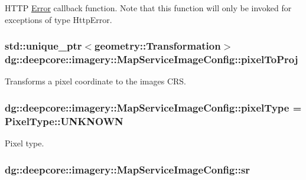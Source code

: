 H\+T\+TP \hyperlink{classdg_1_1deepcore_1_1_error}{Error} callback function. Note that this function will only be invoked for exceptions of type Http\+Error. 

\subsubsection[{\texorpdfstring{pixel\+To\+Proj}{pixelToProj}}]{\setlength{\rightskip}{0pt plus 5cm}std\+::unique\+\_\+ptr$<${\bf geometry\+::\+Transformation}$>$ dg\+::deepcore\+::imagery\+::\+Map\+Service\+Image\+Config\+::pixel\+To\+Proj}\hypertarget{structdg_1_1deepcore_1_1imagery_1_1_map_service_image_config_aae8a095c9f950f114e113e86b82ecf66}{}\label{structdg_1_1deepcore_1_1imagery_1_1_map_service_image_config_aae8a095c9f950f114e113e86b82ecf66}


Transforms a pixel coordinate to the image\textquotesingle{}s C\+RS. 

\subsubsection[{\texorpdfstring{pixel\+Type}{pixelType}}]{ dg\+::deepcore\+::imagery\+::\+Map\+Service\+Image\+Config\+::pixel\+Type = {\bf Pixel\+Type\+::\+U\+N\+K\+N\+O\+WN}}\hypertarget{structdg_1_1deepcore_1_1imagery_1_1_map_service_image_config_a0ecef609731a868150ff3ef3faa2f2ae}{}\label{structdg_1_1deepcore_1_1imagery_1_1_map_service_image_config_a0ecef609731a868150ff3ef3faa2f2ae}


Pixel type. 

\subsubsection[{\texorpdfstring{sr}{sr}}]{ dg\+::deepcore\+::imagery\+::\+Map\+Service\+Image\+Config\+::sr}\hypertarget{structdg_1_1deepcore_1_1imagery_1_1_map_service_image_config_a55da203e4d34afdfdfe39f4f1fdafb90}{}\label{structdg_1_1deepcore_1_1imagery_1_1_map_service_image_config_a55da203e4d34afdfdfe39f4f1fdafb90}


